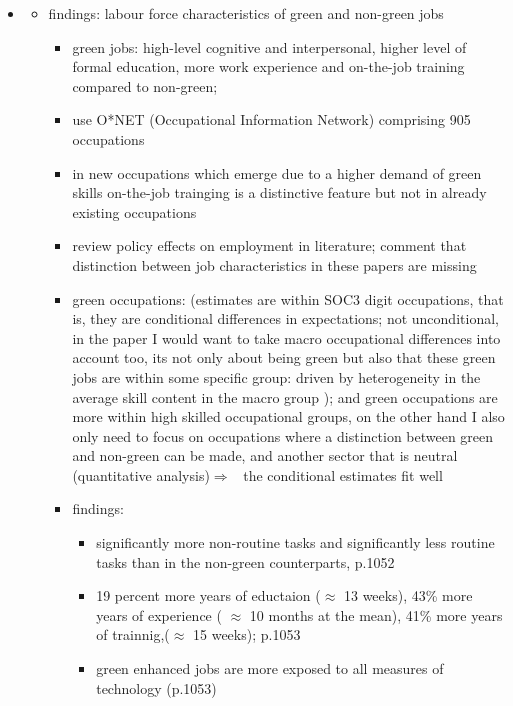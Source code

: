 \documentclass[12pt]{article}
\newcommand{\ar}{$\Rightarrow$ \ }
\begin{document}
\begin{itemize}
\item \cite{Consoli2016DoCapital}
\begin{itemize}
\item findings: labour force characteristics of green and non-green jobs
\begin{itemize}
\item green jobs: high-level cognitive and interpersonal, higher level of formal education, more work experience and on-the-job training compared to non-green; 
\item use O*NET (Occupational Information Network) comprising 905 occupations
\item in new occupations which emerge due to a higher demand of green skills on-the-job trainging is a distinctive feature but not in already existing occupations
\item review policy effects on employment in literature; comment that distinction between job characteristics in these papers are missing
\item green occupations: (estimates are within SOC3 digit occupations, that is, they are conditional differences in expectations; not unconditional, in the paper I would want to take macro occupational differences into account too, its not only about being green but also that these green jobs are within some specific group: driven by heterogeneity in the average skill content in the macro group ); and green occupations are more within high skilled occupational groups, on the other hand I also only need to focus on occupations where a distinction between green and non-green can be made, and another sector that is neutral (quantitative analysis)\ar the conditional estimates fit well
\item findings:
\begin{itemize}
\item 
significantly more non-routine tasks and significantly less routine tasks than in the non-green counterparts, p.1052
\item 19 percent more years of eductaion ($\approx$ 13 weeks), 43\% more years of experience ( $\approx$ 10 months at the mean), 41\% more years of trainnig,($\approx$ 15 weeks); p.1053
\item green enhanced jobs are more exposed to all measures of technology (p.1053) 
\end{itemize}
\end{itemize}
\end{itemize}
\end{itemize}
\end{document}
